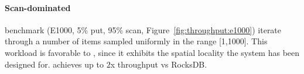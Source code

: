 \paragraph{ Scan-dominated} benchmark (E1000,  5\% put, 95\% scan, Figure~\ref{fig:throughput:e1000})
iterate through a number of items 
sampled uniformly in the range [1,1000]. 
This workload is favorable to \sys, 
since it exhibits the spatial locality the system has been designed for. 
\sys\/ achieves up to $2$x throughput vs RocksDB.   
 

